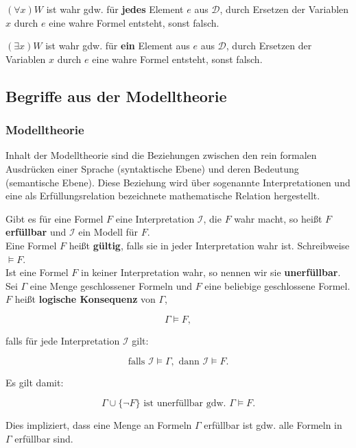 \documentclass[runningheads,deutsch]{llncs}
\begin{document}
$(\forall x) W$ ist wahr gdw. für \textbf{jedes} Element $e$ aus $\mathcal{D}$, durch Ersetzen der Variablen $x$ durch $e$ eine wahre Formel entsteht, sonst falsch.

$(\exists x) W$ ist wahr gdw. für \textbf{ein} Element aus $e$ aus $\mathcal{D}$, durch Ersetzen der Variablen $x$ durch $e$ eine wahre Formel entsteht, sonst falsch.

\subsection{Begriffe aus der Modelltheorie}

\subsubsection{Modelltheorie}
Inhalt der Modelltheorie sind die Beziehungen zwischen den rein formalen Ausdrücken einer Sprache (syntaktische Ebene) und deren Bedeutung (semantische Ebene). Diese Beziehung wird über sogenannte Interpretationen und eine als Erfüllungsrelation bezeichnete mathematische Relation hergestellt.

Gibt es für eine Formel $F$ eine Interpretation $\mathcal{I}$, die $F$ wahr macht, so heißt $F$ \textbf{erfüllbar} und $\mathcal I$ ein Modell für $F$. \\

Eine Formel $F$ heißt \textbf{gültig}, falls sie in jeder Interpretation wahr ist. Schreibweise $\vDash F$. \\

Ist eine Formel $F$ in keiner Interpretation wahr, so nennen wir sie \textbf{unerfüllbar}. \\

Sei $\Gamma$ eine Menge geschlossener Formeln und $F$ eine beliebige geschlossene Formel. $F$ heißt \textbf{logische Konsequenz} von $\Gamma$,

\[
    \Gamma \vDash F,
\]

falls für jede Interpretation $\mathcal I$ gilt:

\[
    \text{falls } \mathcal I \vDash \Gamma, \text{ dann } \mathcal I \vDash F.
\]

Es gilt damit:

\[
    \Gamma \cup \{\lnot F\} \text{ ist unerfüllbar gdw. } \Gamma \vDash F.
\]

Dies impliziert, dass eine Menge an Formeln $\Gamma$ erfüllbar ist gdw. alle Formeln in $\Gamma$ erfüllbar sind.
\end{document}
